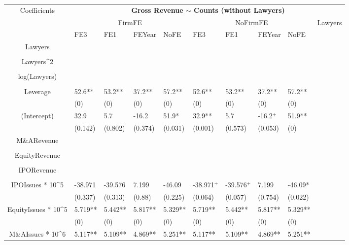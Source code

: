 \documentclass{article}
\begin{document}
\begin{table}[H]
\centering
\begin{tabular}{|clllllllll|}
\hline
\multirow{3}{*}{Coefficients} & \multicolumn{9}{c|}{\textbf{Gross Revenue $\sim$ Counts (without Lawyers)}} \\
\cline{2-10}
& \multicolumn{4}{c}{FirmFE} & \multicolumn{4}{c}{NoFirmFE} & \multirow{2}{*}{Lawyers} \\
\cline{2-9}
& FE3 & FE1 & FEYear & NoFE & FE3 & FE1 & FEYear & NoFE &  \\
\hline
 
Lawyers &  &  &  &  &  &  &  &  & \\ 
   &  &  &  &  &  &  &  &  & \\ 
  Lawyers^2 &  &  &  &  &  &  &  &  & \\ 
   &  &  &  &  &  &  &  &  & \\ 
  log(Lawyers) &  &  &  &  &  &  &  &  & \\ 
   &  &  &  &  &  &  &  &  & \\ 
  Leverage & 52.6** & 53.2** & 37.2** & 57.2** & 52.6** & 53.2** & 37.2** & 57.2** & \\ 
   & (0) & (0) & (0) & (0) & (0) & (0) & (0) & (0) & \\ 
  (Intercept) & 32.9 & 5.7 & -16.2 & 51.9* & 32.9** & 5.7 & -16.2$^{+}$ & 51.9** & \\ 
   & (0.142) & (0.802) & (0.374) & (0.031) & (0.001) & (0.573) & (0.053) & (0) & \\ 
  M\&ARevenue &  &  &  &  &  &  &  &  & \\ 
   &  &  &  &  &  &  &  &  & \\ 
  EquityRevenue &  &  &  &  &  &  &  &  & \\ 
   &  &  &  &  &  &  &  &  & \\ 
  IPORevenue &  &  &  &  &  &  &  &  & \\ 
   &  &  &  &  &  &  &  &  & \\ 
  IPOIssues * 10^5 & -38.971 & -39.576 & 7.199 & -46.09 & -38.971$^{+}$ & -39.576$^{+}$ & 7.199 & -46.09* & \\ 
   & (0.337) & (0.313) & (0.88) & (0.225) & (0.064) & (0.057) & (0.754) & (0.022) & \\ 
  EquityIssues * 10^5 & 5.719** & 5.442** & 5.817** & 5.329** & 5.719** & 5.442** & 5.817** & 5.329** & \\ 
   & (0) & (0) & (0) & (0) & (0) & (0) & (0) & (0) & \\ 
  M\&AIssues * 10^6 & 5.117** & 5.109** & 4.869** & 5.251** & 5.117** & 5.109** & 4.869** & 5.251** & \\ 

\end{tabular}
\end{table}
\end{document}
